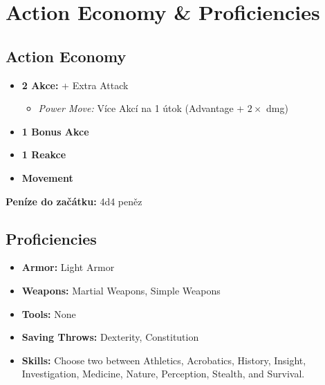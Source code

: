 \documentclass[a4paper, 10pt]{article}
\begin{document}
\section*{Action Economy \& Proficiencies}

\noindent\begin{minipage}[t]{0.48\textwidth}
\subsection*{Action Economy}
\begin{itemize}
    \item \textbf{2 Akce:} + Extra Attack
    \begin{itemize}
        \item \textit{Power Move:} Více Akcí na 1 útok \newline (Advantage + $2\times$ dmg)
    \end{itemize}
    \item \textbf{1 Bonus Akce}
    \item \textbf{1 Reakce}
    \item \textbf{Movement}
\end{itemize}
\vspace{0.5em}
\textbf{Peníze do začátku:} 4d4 peněz
\end{minipage}
\hfill
\begin{minipage}[t]{0.48\textwidth}
\subsection*{Proficiencies}
\begin{itemize}
    \item \textbf{Armor:} Light Armor
    \item \textbf{Weapons:} Martial Weapons, Simple Weapons
    \item \textbf{Tools:} None
    \item \textbf{Saving Throws:} Dexterity, Constitution
    \item \textbf{Skills:} Choose two between Athletics, Acrobatics, History, Insight, Investigation, Medicine, Nature, Perception, Stealth, and Survival.
\end{itemize}
\end{minipage}
\end{document}
